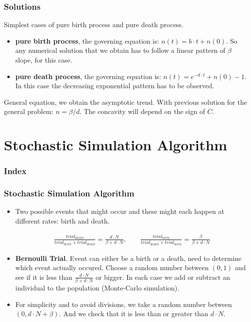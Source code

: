 \documentclass[10pt, usenames, dvipsnames, xcolor=table]{beamer}
\begin{document}
\begin{frame}
\frametitle{Solutions}
Simplest cases of pure birth process and pure death process.
\begin{itemize}
\item \textbf{pure birth process}, the governing equation is: $n(t)=b\cdot t + n(0)$. So any numerical solution that we obtain has to follow a linear pattern of $\beta$ slope, for this case.
\item \textbf{pure death process}, the  governing equation is: $n(t)=e^{-d\cdot t}+n(0)-1$. In this case the decreasing exponential pattern has to be observed.
\end{itemize}
\vspace{0.5cm}
General equation, we obtain the asymptotic trend. With previous solution for the general problem: $n=\beta/d$. The concavity will depend on the sign of $C$.
\end{frame}


\section{Stochastic Simulation Algorithm}
\begin{frame}
  \frametitle{Index}
  \tableofcontents[currentsection]
\end{frame}
\begin{frame}
\frametitle{Stochastic Simulation Algorithm}

\begin{itemize}

\item Two possible events that might occur and these might each happen at different rates: birth and death.

\begin{align*}
\frac{trial_{death}}{trial_{birth}+trial_{death}}= \frac{d\cdot N}{\beta + d\cdot N}, \qquad \frac{trial_{birth}}{trial_{death}+trial_{birth}}= \frac{\beta}{\beta + d\cdot N}
\end{align*}

\item \textbf{Bernoulli Trial}. Event can either be a birth or a death, need to determine which event actually occured. Choose a random number between $(0,1)$ and see if it is less than $\frac{d\cdot N}{\beta + d\cdot N}$ or bigger. In each case we add or subtract an individual to the population (Monte-Carlo simulation).

\item For simplicity and to avoid divisions, we take a random number between $(0,d\cdot N+\beta)$. And we check that it is less than or greater than $d\cdot N$.
\end{itemize}

\end{frame}
\end{document}
